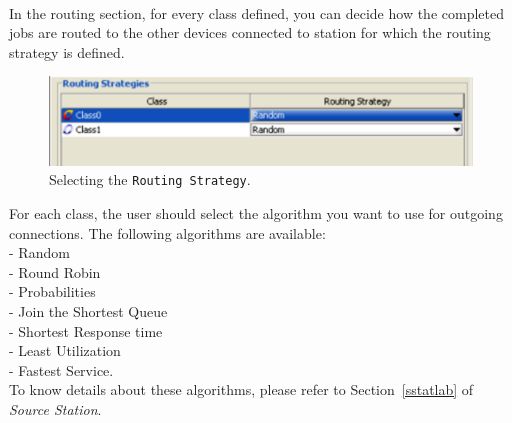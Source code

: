 \\ In the routing section, for
every class defined, you can decide how the completed jobs are
routed to the other devices connected to station for which the
routing strategy is defined.
\begin{figure}[htb]
    \begin{center}
        \includegraphics[scale=.5]{img/jsimg/8.19.eps}
    \end{center}
    \caption{Selecting the \texttt{Routing Strategy}.}
    \label{fig:selroutstrate}
\end{figure}
For each class, the user should select the algorithm you want to
use for outgoing connections. The following algorithms are available:\\
- Random\\ - Round Robin\\ - Probabilities\\ - Join the Shortest Queue\\
- Shortest Response time\\ - Least Utilization\\ - Fastest Service.\\
To know details about these algorithms, please refer to
Section~\ref{sstatlab} of \emph{Source Station}.

